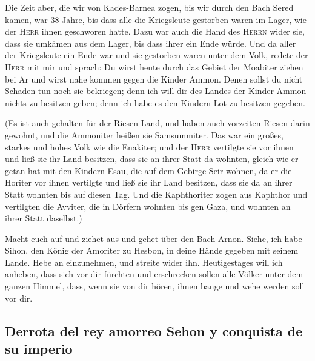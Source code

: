  Die Zeit aber, die wir von Kades-Barnea zogen, bis wir
durch den Bach Sered kamen, war 38 Jahre, bis dass alle die Kriegsleute
gestorben waren im Lager, wie der \textsc{Herr} ihnen geschworen hatte.
 Dazu war auch die Hand des \textsc{Herrn} wider sie,
dass sie umkämen aus dem Lager, bis dass ihrer ein Ende würde.
 Und da aller der Kriegsleute ein Ende war und sie
gestorben waren unter dem Volk,  redete der \textsc{Herr}
mit mir und sprach:  Du wirst heute durch das Gebiet der
Moabiter ziehen bei Ar  und wirst nahe kommen gegen die
Kinder Ammon. Denen sollst du nicht Schaden tun noch sie bekriegen; denn
ich will dir des Landes der Kinder Ammon nichts zu besitzen geben; denn
ich habe es den Kindern Lot zu besitzen gegeben.

 (Es ist auch gehalten für der Riesen Land, und haben
auch vorzeiten Riesen darin gewohnt, und die Ammoniter heißen sie
Samsummiter.  Das war ein großes, starkes und hohes Volk
wie die Enakiter; und der \textsc{Herr} vertilgte sie vor ihnen und ließ
sie ihr Land besitzen, dass sie an ihrer Statt da wohnten,
 gleich wie er getan hat mit den Kindern Esau, die auf
dem Gebirge Seir wohnen, da er die Horiter vor ihnen vertilgte und ließ
sie ihr Land besitzen, dass sie da an ihrer Statt wohnten bis auf diesen
Tag.  Und die Kaphthoriter zogen aus Kaphthor und
vertilgten die Avviter, die in Dörfern wohnten bis gen Gaza, und wohnten
an ihrer Statt daselbst.)

 Macht euch auf und ziehet aus und gehet über den Bach
Arnon. Siehe, ich habe Sihon, den König der Amoriter zu Hesbon, in deine
Hände gegeben mit seinem Lande. Hebe an einzunehmen, und streite wider
ihn.  Heutigestages will ich anheben, dass sich vor dir
fürchten und erschrecken sollen alle Völker unter dem ganzen Himmel,
dass, wenn sie von dir hören, ihnen bange und wehe werden soll vor dir.

\hypertarget{derrota-del-rey-amorreo-sehon-y-conquista-de-su-imperio}{%
\subsection{Derrota del rey amorreo Sehon y conquista de su
imperio}\label{derrota-del-rey-amorreo-sehon-y-conquista-de-su-imperio}}

